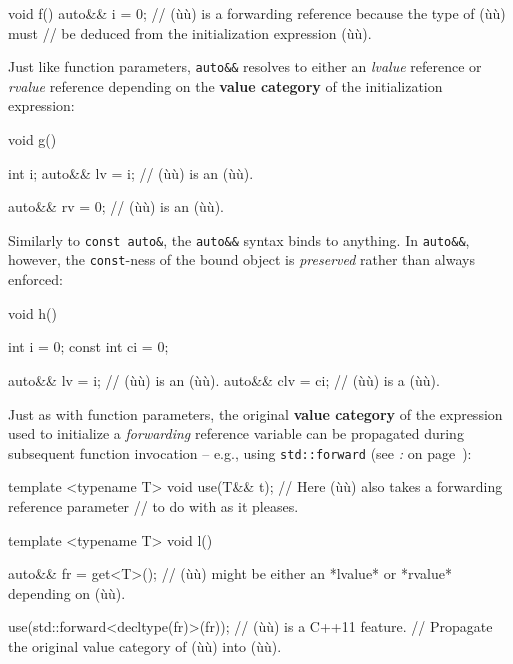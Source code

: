 \begin{emcppslisting}
void f()
{
    auto&& i = 0;  // (ù{}ù) is a forwarding reference because the type of (ù{}ù) must
                   // be deduced from the initialization expression (ù{}ù).
}
\end{emcppslisting}

\noindent Just like function parameters, \texttt{auto\&\&} resolves to either an
\emph{lvalue} reference or \emph{rvalue} reference depending on the
\textbf{value category} of the initialization expression:

\begin{emcppslisting}
void g()
{
    int i;
    auto&& lv = i;  // (ù{}ù) is an (ù{}ù).

    auto&& rv = 0;  // (ù{}ù) is an (ù{}ù).
}
\end{emcppslisting}

\noindent Similarly to \texttt{const}~\texttt{auto\&}, the \texttt{auto\&\&}
syntax binds to anything. In \texttt{auto\&\&}, however, the
\texttt{const}-ness of the bound object is \emph{preserved} rather than
always enforced:

\begin{emcppslisting}
void h()
{
    int        i = 0;
    const int ci = 0;

    auto&& lv  = i;   // (ù{}ù) is an (ù{}ù).
    auto&& clv = ci;  // (ù{}ù) is a (ù{}ù).
}
\end{emcppslisting}

\noindent Just as with function parameters, the original \textbf{value category}
of the expression used to initialize a \emph{forwarding} reference
variable can be propagated during subsequent function invocation --
e.g., using \texttt{std::forward} (see \textit{: } on page~\pageref{the-std::forward-utility}):

\begin{emcppslisting}
template <typename T>
void use(T&& t); // Here (ù{}ù) also takes a forwarding reference parameter
                 // to do with as it pleases.

template <typename T>
void l()
{
    auto&& fr = get<T>();
        // (ù{}ù) might be either an *lvalue* or *rvalue* depending on (ù{}ù).

    use(std::forward<decltype(fr)>(fr));  // (ù{}ù) is a C++11 feature.
        // Propagate the original value category of (ù{}ù) into (ù{}ù).
}
\end{emcppslisting}

